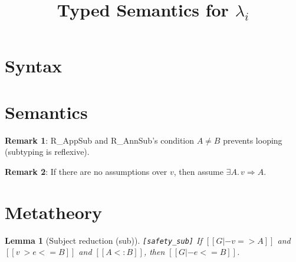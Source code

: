 \documentclass[oneside,a4paper]{article}
\title{\bf Typed Semantics for $\lambda_i$}
\author{}
\date{}
\newtheorem{lemma}[theorem]{Lemma}
\numberwithin{equation}{section}
\begin{document}
\maketitle

\section{Syntax}
\begin{small}
\begin{spacing}{0.4}
\gram{
  \otte\ottinterrule
}
\end{spacing}
\end{small}

\section{Semantics}
\begin{spacing}{0.4}
\begin{small}
\noindent
\ottdefntypedvalinf{}\ottinterrule
\ottdefntypedvalchk{}\ottinterrule
\ottdefnreductioninf{}\ottinterrule
\ottdefnreductionchk{}\ottinterrule
\end{small}
\end{spacing}
\noindent\textbf{Remark 1}:
R\_AppSub and R\_AnnSub's condition $A \neq B$ prevents looping 
        (subtyping is reflexive).

\noindent\textbf{Remark 2}:
If there are no assumptions over $v$, then assume $\exists A.\, v \Rightarrow A$. 
\newpage
\section{Metatheory}

\begin{lemma}[Subject reduction (sub)]\verb|[safety_sub]|
  If $[[G |- v => A]]$ 
  and $[[v ~> e <= B]]$
  and $[[A <: B]]$, then 
  $[[G |- e <= B]]$.
\end{lemma}
\end{document}
